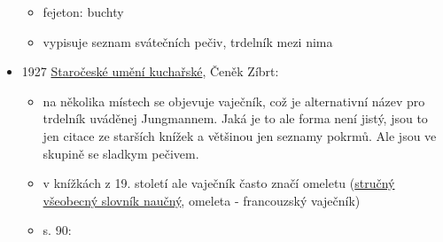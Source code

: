 \begin{itemize}
  \begin{itemize}
  \tightlist
  \item
    fejeton: buchty
  \item
    vypisuje seznam svátečních pečiv, trdelník mezi nima
  \end{itemize}
\item
  1927
  \href{https://ndk.cz/uuid/uuid:b59a1ff0-9f23-11ea-b6e0-005056827e51}{Staročeské
  umění kuchařské}, Čeněk Zíbrt:

  \begin{itemize}
  \tightlist
  \item
    na několika místech se objevuje vaječník, což je alternativní název
    pro trdelník uváděnej Jungmannem. Jaká je to ale forma není jistý,
    jsou to jen citace ze starších knížek a většinou jen seznamy pokrmů.
    Ale jsou ve skupině se sladkym pečivem.
  \item
    v knížkách z 19. století ale vaječník často značí omeletu
    (\href{https://ndk.cz/uuid/uuid:f7e03900-d300-11dc-9815-000d606f5dc6}{stručný
    všeobecný slovník naučný}, omeleta - francouzský vaječník)
  \item
    s. 90:


\end{itemize}
\end{itemize}
